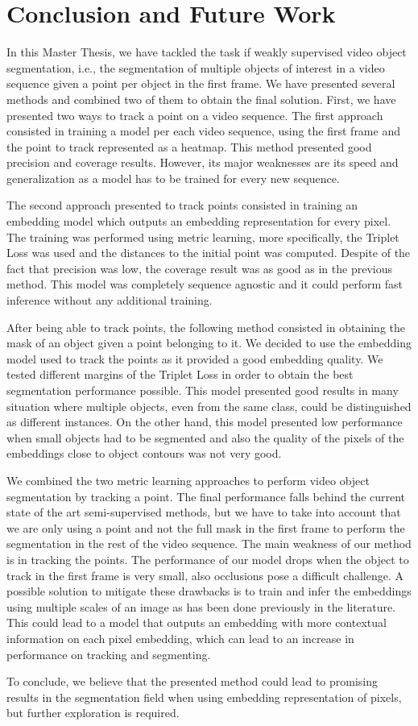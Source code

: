 
\chapter{Conclusion and Future Work}
\label{cha:conclusionsfuturework}

In this Master Thesis, we have tackled the task if weakly supervised video object segmentation, i.e., 
the segmentation of multiple objects of interest in a video sequence given a point per object in the first frame.
We have presented several methods and combined two of them to obtain the final solution.
First, we have presented two ways to track a point on a video sequence.
The first approach consisted in training a model per each video sequence, 
using the first frame and the point to track represented as a heatmap.
This method presented good precision and coverage results. 
However, its major weaknesses are its speed and generalization as a model has to be trained for every new sequence.

The second approach presented to track points consisted in training an embedding model which outputs an embedding representation for every pixel.
The training was performed using metric learning, more specifically, the Triplet Loss was used and the distances to the initial point was computed.
Despite of the fact that precision was low, the coverage result was as good as in the previous method.
This model was completely sequence agnostic and it could perform fast inference without any additional training.

After being able to track points, the following method consisted in obtaining the mask of an object given a point belonging to it.
We decided to use the embedding model used to track the points as it provided a good embedding quality.
We tested different margins of the Triplet Loss in order to obtain the best segmentation performance possible.
This model presented good results in many situation where multiple objects, even from the same class, 
could be distinguished as different instances.
On the other hand, 
this model presented low performance when small objects had to be segmented and also the quality of the pixels of the embeddings close to object contours was not very good.

We combined the two metric learning approaches to perform video object segmentation by tracking a point. The final performance falls behind the current state of the art semi-supervised methods, but we have to take into account that we are only using a point and not the full mask in the first frame to perform the segmentation in the rest of the video sequence.
The main weakness of our method is in tracking the points. The performance of our model drops when the object to track in the first frame is very small, also occlusions pose a difficult challenge.
A possible solution to mitigate these drawbacks is to train and infer the embeddings using multiple scales of an image as has been done previously in the literature.
This could lead to a model that outputs an embedding with more contextual information on each pixel embedding, which can lead to an increase in performance on tracking and segmenting.

To conclude, we believe that the presented method could lead to promising results in the segmentation field when using embedding representation of pixels, but further exploration is required. 
